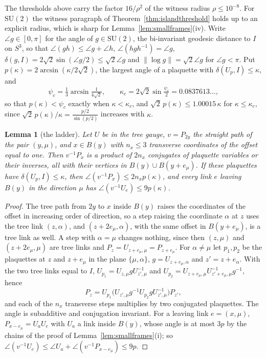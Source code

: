 \documentclass[11pt]{amsart}
\newtheorem{lemma}[theorem]{Lemma}
\theoremstyle{definition}
\theoremstyle{remark}
\numberwithin{equation}{section}
\newcommand{\SU}{\mathrm{SU}}
\begin{document}
The thresholds above carry the factor $16/\rho^2$ of the witness radius
$\rho\le10^{-8}$. For $\SU(2)$ the witness paragraph of
Theorem~\ref{thm:islandthreshold} holds up to an explicit radius, which is
sharp for Lemma~\ref{lem:smallframes}(iv). Write $\angle g\in[0,\pi]$ for the
angle of $g\in\SU(2)$, the bi-invariant geodesic distance to $I$ on $S^3$,
so that $\angle(gh)\le\angle g+\angle h$, $\angle(hgh^{-1})=\angle g$,
$\delta(g,I)=2\sqrt2\sin(\angle g/2)\le\sqrt2\angle g$ and $\lVert\log g
\rVert=\sqrt2\angle g$ for $\angle g<\pi$. Put $p(\kappa)=2\arcsin(\kappa/
2\sqrt2)$, the largest angle of a plaquette with $\delta(U_p,I)\le\kappa$, and
\[
\psi_c=\tfrac13\arcsin\tfrac1{4\sqrt2},\qquad
\kappa_c=2\sqrt2\sin\tfrac{\psi_c}2=0.0837613\ldots,
\]
so that $p(\kappa)<\psi_c$ exactly when $\kappa<\kappa_c$, and $\sqrt2\,p(\kappa)
\le1.00015\,\kappa$ for $\kappa\le\kappa_c$, since $\sqrt2\,p(\kappa)/\kappa=
\frac{p/2}{\sin(p/2)}$ increases with $\kappa$.

\begin{lemma}[the ladder]\label{lem:ladder}
Let $U$ be in the tree gauge, $v=P_{2y}$ the straight path of the pair
$(y,\mu)$, and $x\in B(y)$ with $n_x\le3$ transverse coordinates of the
offset equal to one. Then $v^{-1}P_x$ is a product of $2n_x$ conjugates of
plaquette variables or their inverses, all with their vertices in $B(y)\cup
B(y+e_\mu)$. If these plaquettes have $\delta(U_p,I)\le\kappa$, then
$\angle(v^{-1}P_x)\le2n_xp(\kappa)$, and every link $e$ leaving $B(y)$ in
the direction $\mu$ has $\angle(v^{-1}U_e)\le9p(\kappa)$.
\end{lemma}

\begin{proof}
The tree path from $2y$ to $x$ inside $B(y)$ raises the coordinates of the
offset in increasing order of direction, so a step raising the coordinate
$\alpha$ at $z$ uses the tree link $(z,\alpha)$, and $(z+2e_\mu,\alpha)$,
with the same offset in $B(y+e_\mu)$, is a tree link as well. A step with
$\alpha=\mu$ changes nothing, since then $(z,\mu)$ and $(z+2e_\mu,\mu)$ are
tree links and $P_z=U_{z+e_\mu,\mu}=P_{z+e_\mu}$. For $\alpha\ne\mu$ let
$p_1,p_2$ be the plaquettes at $z$ and $z+e_\mu$ in the plane $\{\mu,\alpha\}$,
$g=U_{z+e_\mu,\alpha}$ and $z'=z+e_\alpha$. With the two tree links equal to
$I$, $U_{p_1}=U_{z,\mu}gU_{z',\mu}^{-1}$ and $U_{p_2}=U_{z+e_\mu,\mu}
U_{z'+e_\mu,\mu}^{-1}g^{-1}$, hence
\[
P_z=U_{p_1}\bigl(U_{z',\mu}g^{-1}U_{p_2}gU_{z',\mu}^{-1}\bigr)P_{z'},
\]
and each of the $n_x$ transverse steps multiplies by two conjugated
plaquettes. The angle is subadditive and conjugation invariant. For a
leaving link $e=(x,\mu)$, $P_{x-e_\mu}=U_aU_e$ with $U_a$ a link inside
$B(y)$, whose angle is at most $3p$ by the chains of the proof of
Lemma~\ref{lem:smallframes}(i); so $\angle(v^{-1}U_e)\le\angle U_a+
\angle(v^{-1}P_{x-e_\mu})\le9p$.
\end{proof}
\end{document}
